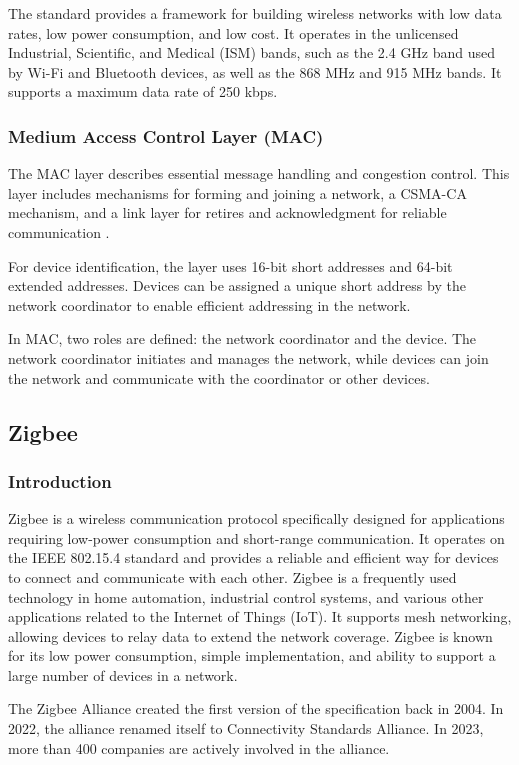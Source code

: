 The standard provides a framework for building wireless networks with low data rates, low power consumption, and low cost.
It operates in the unlicensed Industrial, Scientific, and Medical (ISM) bands, such as the 2.4 GHz band used by Wi-Fi
and Bluetooth devices, as well as the 868 MHz and 915 MHz bands.
It supports a maximum data rate of 250 kbps.

\subsubsection{Medium Access Control Layer (MAC)}
The MAC layer describes essential message handling and congestion control.
This layer includes mechanisms for forming and joining a network, a CSMA-CA mechanism,
and a link layer for retires and acknowledgment for reliable communication \cite{zigbee:silabs:ug103:2}.

For device identification, the layer uses 16-bit short addresses and 64-bit extended addresses.
Devices can be assigned a unique short address by the network coordinator to enable efficient addressing in the network.

In MAC, two roles are defined: the network coordinator and the device.
The network coordinator initiates and manages the network, while devices can join the network
and communicate with the coordinator or other devices.


\subsection{Zigbee}
\label{sec:zig}

\subsubsection{Introduction}
\label{zb:into}
Zigbee is a wireless communication protocol specifically designed for
applications requiring low-power consumption and short-range communication.
It operates on the IEEE 802.15.4 standard and provides a reliable and efficient way
for devices to connect and communicate with each other.
Zigbee is a frequently used technology in home automation, industrial control systems,
and various other applications related to the Internet of Things (IoT).
It supports mesh networking, allowing devices to relay data to extend the network
coverage. Zigbee is known for its low power consumption, simple implementation, and
ability to support a large number of devices in a network.

The Zigbee Alliance created the first version of the specification back in 2004.
In 2022, the alliance renamed itself to Connectivity Standards Alliance.
In 2023, more than 400 companies are actively involved in the alliance. \cite{csa:members}

